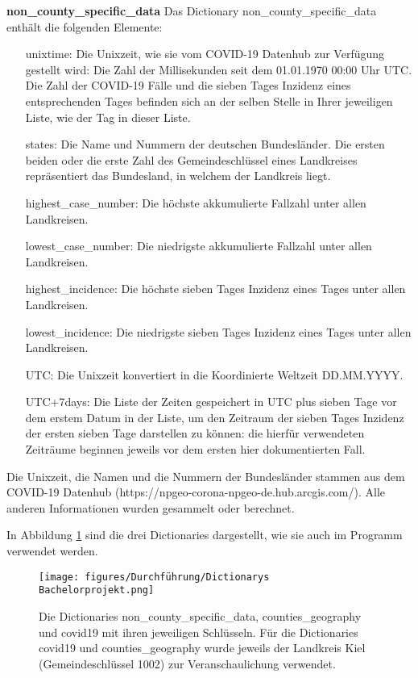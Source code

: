 \textbf{non\_county\_specific\_data}
Das Dictionary non\_county\_specific\_data enthält die folgenden Elemente:
\begin{itemize}
    \item[unixtime:] Die Unixzeit, wie sie vom COVID-19 Datenhub zur Verfügung gestellt wird: Die Zahl der Millisekunden seit dem 01.01.1970 00:00 Uhr UTC. Die Zahl der COVID-19 Fälle und die sieben Tages Inzidenz eines entsprechenden Tages befinden sich an der selben Stelle in Ihrer jeweiligen Liste, wie der Tag in dieser Liste.
    \item[states:] Die Name und Nummern der deutschen Bundesländer. Die ersten beiden oder die erste Zahl des Gemeindeschlüssel eines Landkreises repräsentiert das Bundesland, in welchem der Landkreis liegt.
    \item[highest\_case\_number:] Die höchste akkumulierte Fallzahl unter allen Landkreisen.
    \item[lowest\_case\_number:] Die niedrigste akkumulierte Fallzahl unter allen Landkreisen.
    \item[highest\_incidence:] Die höchste sieben Tages Inzidenz eines Tages unter allen Landkreisen.
    \item[lowest\_incidence:] Die niedrigste sieben Tages Inzidenz eines Tages unter allen Landkreisen.
    \item[UTC:] Die Unixzeit konvertiert in die Koordinierte Weltzeit \glqq{}DD.MM.YYYY\grqq{}.
    \item[UTC+7days:] Die Liste der Zeiten gespeichert in UTC plus sieben Tage vor dem erstem Datum in der Liste, um den Zeitraum der sieben Tages Inzidenz der ersten sieben Tage darstellen zu können: die hierfür verwendeten Zeiträume beginnen jeweils vor dem ersten hier dokumentierten Fall.
\end{itemize}
Die Unixzeit, die Namen und die Nummern der Bundesländer stammen aus dem \glqq{}COVID-19 Datenhub\grqq{} (https://npgeo-corona-npgeo-de.hub.arcgis.com/). Alle anderen Informationen wurden gesammelt oder berechnet.

In Abbildung \ref{fig:dicts_als_code} sind die drei Dictionaries dargestellt, wie sie auch im Programm verwendet werden.
\begin{figure}[H]
    \centering
    \texttt{[image: figures/Durchführung/Dictionarys Bachelorprojekt.png]}
    \caption{
    Die Dictionaries non\_county\_specific\_data, counties\_geography und covid19 mit ihren jeweiligen Schlüsseln.
    Für die Dictionaries covid19 und counties\_geography wurde jeweils der Landkreis Kiel (Gemeindeschlüssel 1002) zur Veranschaulichung verwendet.}
    \label{fig:dicts_als_code}
\end{figure}


